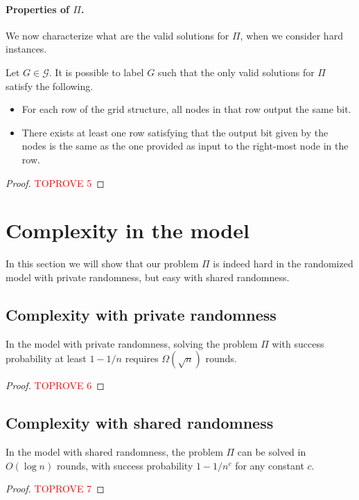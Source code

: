 \documentclass[11pt]{article}
\begin{document}
\paragraph{\boldmath Properties of $\Pi$.}
We now characterize what are the valid solutions for $\Pi$, when we consider hard instances.
\begin{lemma}\label{lem:pi-good-sol}
	Let $G \in \mathcal{G}$. It is possible to label $G$ such that the only valid solutions for $\Pi$ satisfy the following.
	\begin{itemize}
		\item For each row of the grid structure, all nodes in that row output the same bit.
		\item There exists at least one row satisfying that the output bit given by the nodes is the same as the one provided as input to the right-most node in the row.
	\end{itemize}
\end{lemma}
\begin{proof}\textcolor{red}{TOPROVE 5}\end{proof}
	

\section{Complexity in the \local model}\label{sec:pi-complexity}

In this section we will show that our problem $\Pi$ is indeed hard in the randomized \local model with private randomness, but easy with shared randomness.

\subsection{Complexity with private randomness}

\begin{theorem}\label{th:private-rand}
	In the \local model with private randomness, solving the problem $\Pi$ with success probability at least $1 - 1/n$ requires $\Omega(\sqrt{n})$ rounds.
\end{theorem}
\begin{proof}\textcolor{red}{TOPROVE 6}\end{proof}

\subsection{Complexity with shared randomness}
\begin{theorem}\label{thm:ub-shared-rand}
	In the \local model with shared randomness, the problem $\Pi$ can be solved in $O(\log n)$ rounds, with success probability $1 - 1/n^c$ for any constant $c$.
\end{theorem}
\begin{proof}\textcolor{red}{TOPROVE 7}\end{proof}
\end{document}
